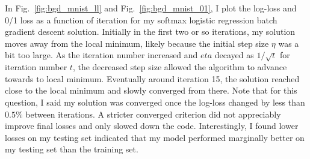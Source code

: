 \documentclass[12pt]{amsart}
\begin{document}
In Fig.~\ref{fig:bgd_mnist_ll} and Fig.~\ref{fig:bgd_mnist_01}, I plot the log-loss and 0/1 loss as a function of iteration for my softmax logistic regression batch gradient descent solution.  Initially in the first two or so iterations, my solution moves away from the local minimum, likely because the initial step size $\eta$ was a bit too large.  As the iteration number increased and $eta$ decayed as $1/\sqrt{t}$ for iteration number $t$, the decreased step size allowed the algorithm to advance towards to local minimum.  Eventually around iteration 15, the solution reached close to the local minimum and slowly converged from there.  Note that for this question, I said my solution was converged once the log-loss changed by less than $0.5\%$ between iterations.  A stricter converged criterion did not appreciably improve final losses and only slowed down the code.  Interestingly, I found lower losses on my testing set indicated that my model performed marginally better on my testing set than the training set.
\end{document}

